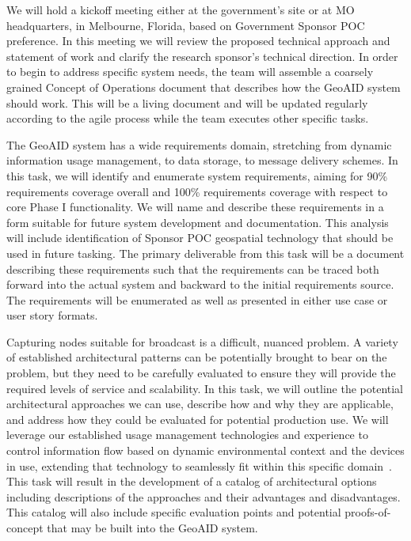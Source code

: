 \documentclass{sbir}
\begin{document}
We will hold a kickoff meeting either at the government's site or at MO headquarters, in Melbourne, Florida, based on Government Sponsor POC preference. In this meeting we will review the proposed technical approach and statement of work and clarify the research sponsor's technical direction. In order to begin to address specific system needs, the team will assemble a coarsely grained Concept of Operations document that describes how the GeoAID system should work. This will be a living document and will be updated regularly according to the agile process while the team executes other specific tasks. 

The GeoAID system has a wide requirements domain, stretching from dynamic information usage management, to data storage, to message delivery schemes. In this task, we will identify and enumerate system requirements, aiming for 90\% requirements coverage overall and 100\% requirements coverage with respect to core Phase I functionality. We will name and describe these requirements in a form suitable for future system development and documentation. This analysis will include identification of Sponsor POC geospatial technology that should be used in future tasking.
The primary deliverable from this task will be a document describing these requirements such that the requirements can be traced both forward into the actual system and backward to the initial requirements source. The requirements will be enumerated as well as presented in either use case or user story formats.

Capturing nodes suitable for broadcast is a difficult, nuanced problem. A variety of established architectural patterns can be potentially brought to bear on the problem, but they need to be carefully evaluated to ensure they will provide the required levels of service and scalability. In this task, we will outline the potential architectural approaches we can use, describe how and why they are applicable, and address how they could be evaluated for potential production use. We will leverage our established usage management technologies and experience to control information flow based on dynamic environmental context and the devices in use, extending that technology to seamlessly fit within this specific domain~\cite{JaLaHe:11,JaLaHe:12}.
This task will result in the development of a catalog of architectural options including descriptions of the approaches and their advantages and disadvantages. This catalog will also include specific evaluation points and potential proofs-of-concept that may be built into the GeoAID system.
\end{document}
